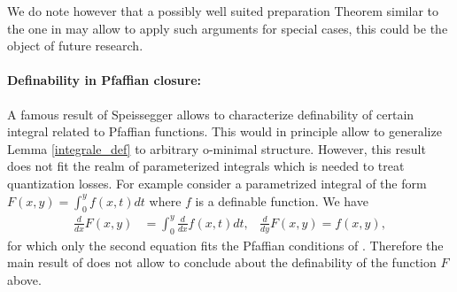 \documentclass[11pt]{article}
\newcommand{\1}{\mathbbm{1}}
\numberwithin{equation}{section}
\begin{document}
We do note however that a possibly well suited preparation Theorem similar to the one in \cite{opris2021preparation} may allow to apply such arguments for special cases, this could be the object of future research. 


\paragraph{Definability in Pfaffian closure:}
A famous result of Speissegger \cite{speissegger1999pfaffian} allows to characterize definability of certain integral related to Pfaffian functions. This would in principle allow to generalize Lemma \ref{integrale_def} to arbitrary o-minimal structure. However, this result does not fit the realm of parameterized integrals which is needed to treat quantization losses.
For example consider a parametrized integral of the form $F(x,y) = \int_0^y f(x,t)dt$ where $f$ is a definable function. We have
\begin{align*}
    \frac{d}{dx} F(x,y) & = \int_0^y \frac{d}{dx} f(x,t)dt,
    &\frac{d}{dy} F(x,y) = f(x,y),
\end{align*}
for which only the second equation fits the Pfaffian conditions of \cite{speissegger1999pfaffian}. Therefore the main result of \cite{speissegger1999pfaffian} does not allow to conclude about the definability of the function $F$ above. 
\end{document}
